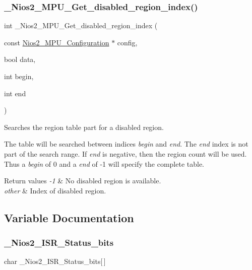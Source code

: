 \subsubsection{\texorpdfstring{\_Nios2\_MPU\_Get\_disabled\_region\_index()}{\_Nios2\_MPU\_Get\_disabled\_region\_index()}}
{\footnotesize\ttfamily int \+\_\+\+Nios2\+\_\+\+M\+P\+U\+\_\+\+Get\+\_\+disabled\+\_\+region\+\_\+index (\begin{DoxyParamCaption}\item[{const \mbox{\hyperlink{structNios2__MPU__Configuration}{Nios2\+\_\+\+M\+P\+U\+\_\+\+Configuration}} $\ast$}]{config,  }\item[{bool}]{data,  }\item[{int}]{begin,  }\item[{int}]{end }\end{DoxyParamCaption})}



Searches the region table part for a disabled region. 

The table will be searched between indices {\itshape begin} and {\itshape end}. The {\itshape end} index is not part of the search range. If {\itshape end} is negative, then the region count will be used. Thus a {\itshape begin} of 0 and a {\itshape end} of -\/1 will specify the complete table.


\begin{DoxyRetVals}{Return values}
{\em -\/1} & No disabled region is available. \\
\hline
{\em other} & Index of disabled region. \\
\hline
\end{DoxyRetVals}


\subsection{Variable Documentation}
\mbox{\label{nios2-utility_8h_a716d831ea403d46ec0653819efa808c4}} 
\subsubsection{\texorpdfstring{\_Nios2\_ISR\_Status\_bits}{\_Nios2\_ISR\_Status\_bits}}
{\footnotesize\ttfamily char \+\_\+\+Nios2\+\_\+\+I\+S\+R\+\_\+\+Status\+\_\+bits\mbox{[}$\,$\mbox{]}}



